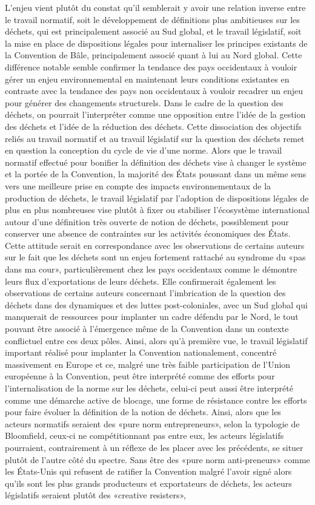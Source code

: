 \documentclass[12pt]{ulaval}
\begin{document}
L'enjeu vient plutôt du constat qu'il semblerait y avoir une relation inverse entre le travail normatif, soit le développement de définitions plus ambitieuses sur les déchets, qui est principalement associé au Sud global, et le travail législatif, soit la mise en place de dispositions légales pour internaliser les principes existants de la Convention de Bâle, principalement associé quant à lui au Nord global. Cette différence notable semble confirmer la tendance des pays occidentaux à vouloir gérer un enjeu environnemental en maintenant leurs conditions existantes en contraste avec la tendance des pays non occidentaux à vouloir recadrer un enjeu pour générer des changements structurels. Dans le cadre de la question des déchets, on pourrait l'interpréter comme une opposition entre l'idée de la gestion des déchets et l'idée de la réduction des déchets. Cette dissociation des objectifs reliés au travail normatif et au travail législatif sur la question des déchets remet en question la conception du cycle de vie d'une norme. Alors que le travail normatif effectué pour bonifier la définition des déchets vise à changer le système et la portée de la Convention, la majorité des États poussant dans un même sens vers une meilleure prise en compte des impacts environnementaux de la production de déchets, le travail législatif par l'adoption de dispositions légales de plus en plus nombreuses vise plutôt à fixer ou stabiliser l'écosystème international autour d'une définition très ouverte de notion de déchets, possiblement pour conserver une absence de contraintes sur les activités économiques des États. Cette attitude serait en correspondance avec les observations de certains auteurs sur le fait que les déchets sont un enjeu fortement rattaché au syndrome du «pas dans ma cour», particulièrement chez les pays occidentaux comme le démontre leurs flux d'exportations de leurs déchets. Elle confirmerait également les observations de certains auteurs concernant l'imbrication de la question des déchets dans des dynamiques et des luttes post-coloniales, avec un Sud global qui manquerait de ressources pour implanter un cadre défendu par le Nord, le tout pouvant être associé à l'émergence même de la Convention dans un contexte conflictuel entre ces deux pôles. Ainsi, alors qu'à première vue, le travail législatif important réalisé pour implanter la Convention nationalement, concentré massivement en Europe et ce, malgré une très faible participation de l'Union européenne à la Convention, peut être interprété comme des efforts pour l'internalisation de la norme sur les déchets, celui-ci peut aussi être interprété comme une démarche active de blocage, une forme de résistance contre les efforts pour faire évoluer la définition de la notion de déchets. Ainsi, alors que les acteurs normatifs seraient des «pure norm entrepreneurs», selon la typologie de Bloomfield, ceux-ci ne compétitionnant pas entre eux, les acteurs législatifs pourraient, contrairement à un réflexe de les placer avec les précédents, se situer plutôt de l'autre côté du spectre. Sans être des «pure norm anti-preneurs» comme les États-Unis qui refusent de ratifier la Convention malgré l'avoir signé alors qu'ils sont les plus grands producteurs et exportateurs de déchets, les acteurs législatifs seraient plutôt des «creative resisters», 
\end{document}
